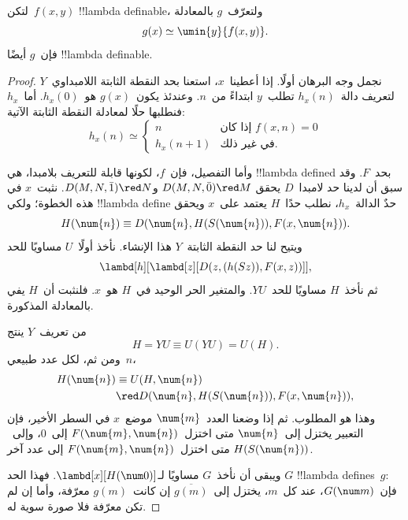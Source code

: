 \documentclass[../../../include/open-logic-section]{subfiles}
\begin{document}

\begin{lem}
لتكن~$f(x,y)$ !!{lambda definable}، ولتعرّف~$g$ بالمعادلة
\[
g(x) \simeq \umin{y}{f(x,y)}.
\]
فإن~$g$ أيضًا !!{lambda definable}.
\end{lem}

\begin{proof}
نجمل وجه البرهان أولًا. إذا أعطينا~$x$، استعنا بحد النقطة الثابتة
اللامبداوي~$Y$ لتعريف دالة~$h_x(n)$ تطلب~$y$ ابتداءً من~$n$.
وعندئذ يكون~$g(x)$ هو~$h_x(0)$. أما~$h_x$ فنطلبها حلًا لمعادلة النقطة الثابتة الآتية:
\[
h_x(n) \simeq
\begin{cases}
n & \text{إذا كان $f(x,n) = 0$} \\
h_x(n+1) & \text{في غير ذلك.}
\end{cases}
\]

وأما التفصيل، فإن~$f$، لكونها قابلة للتعريف بلامبدا، هي
!!{lambda defined} بحد~$F$. وقد سبق أن لدينا حد لامبدا~$D$ يحقق
$D(M, N, \bar{0}) \red M$ و$D(M, N, \bar{1}) \red N$. نثبت~$x$ في هذه الخطوة؛ ولكي !!{lambda define} حدٌ الدالة~$h_x$،
نطلب حدًا~$H$ يعتمد على~$x$ ويحقق
\[
H(\num{n}) \equiv D(\num{n}, H(S(\num{n})), F(x, \num{n})).
\]
ويتيح لنا حد النقطة الثابتة~$Y$ هذا الإنشاء. نأخذ أولًا~$U$ مساويًا للحد
\[
\lambd[h][\lambd[z][D(z,(h(Sz)),F(x,z))]],
\]
ثم نأخذ~$H$ مساويًا للحد~$YU$. والمتغير الحر الوحيد في~$H$ هو~$x$.
فلنثبت أن~$H$ يفي بالمعادلة المذكورة.

من تعريف~$Y$ ينتج
\[
H = YU \equiv U(YU) = U(H).
\]
ومن ثم، لكل عدد طبيعي~$n$،
\begin{align*}
H(\num{n}) & \equiv U(H, \num{n}) \\
& \red D(\num{n}, H(S(\num{n})), F(x, \num{n})),
\end{align*}
وهذا هو المطلوب. ثم إذا وضعنا العدد~$\num{m}$ موضع~$x$ في السطر الأخير،
فإن التعبير يختزل إلى~$\num{n}$ متى اختزل~$F(\num{m}, \num{n})$ إلى~$\num{0}$،
وإلى~$H(S(\num{n}))$ متى اختزل~$F(\num{m}, \num{n})$ إلى عدد آخر.

ويبقى أن نأخذ~$G$ مساويًا لـ$\lambd[x][H(\num 0)]$. فهذا الحد
$G$ !!{lambda define}s~$g$: فإن~$G(\num m)$، عند كل~$m$،
يختزل إلى~$\overline {g(m)}$ إن كانت~$g(m)$ معرّفة، وأما إن لم تكن معرّفة فلا صورة سوية له.
\end{proof}
\end{document}
